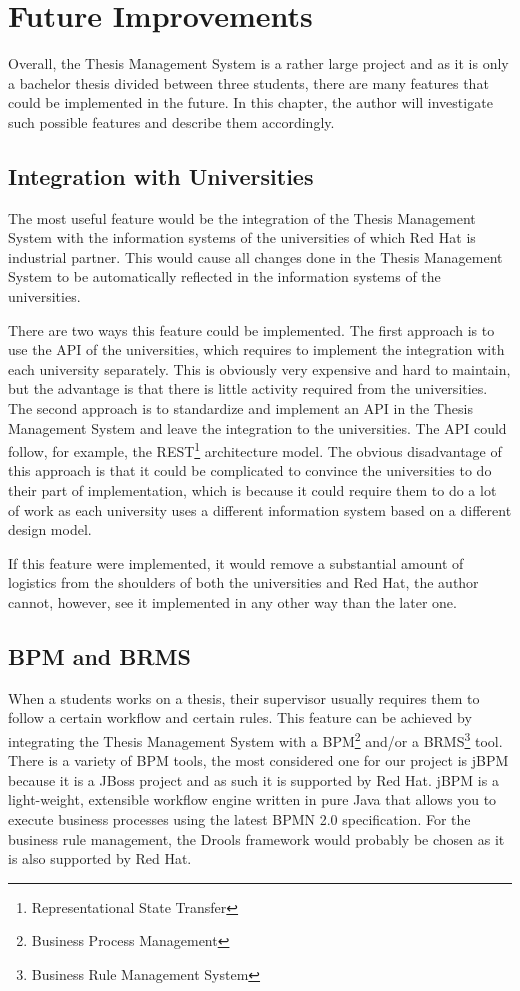\chapter{Future Improvements}

Overall, the Thesis Management System is a rather large project and as it is only a bachelor thesis divided between three students, there are many features that could be implemented in the future. In this chapter, the author will investigate such possible features and describe them accordingly.

\section{Integration with Universities}

The most useful feature would be the integration of the Thesis Management System with the information systems of the universities of which Red Hat is industrial partner. This would cause all changes done in the Thesis Management System to be automatically reflected in the information systems of the universities. 

There are two ways this feature could be implemented. The first approach is to use the API of the universities, which requires to implement the integration with each university separately. This is obviously very expensive and hard to maintain, but the advantage is that there is little activity required from the universities. The second approach is to standardize and implement an API in the Thesis Management System and leave the integration to the universities. The API could follow, for example, the REST\footnote{Representational State Transfer} architecture model. The obvious disadvantage of this approach is that it could be complicated to convince the universities to do their part of implementation, which is because it could require them to do a lot of work as each university uses a different information system based on a different design model. 

If this feature were implemented, it would remove a substantial amount of logistics from the shoulders of both the universities and Red Hat, the author cannot, however, see it implemented in any other way than the later one.

\section{BPM and BRMS}

When a students works on a thesis, their supervisor usually requires them to follow a certain workflow and certain rules. This feature can be achieved by integrating the Thesis Management System with a BPM\footnote{Business Process Management} and/or a BRMS\footnote{Business Rule Management System} tool. There is a variety of BPM tools, the most considered one for our project is jBPM because it is a JBoss project and as such it is supported by Red Hat. jBPM is a light-weight, extensible workflow engine written in pure Java that allows you to execute business processes using the latest BPMN 2.0 specification\cite{jbpm-homepage}. For the business rule management, the Drools framework would probably be chosen as it is also supported by Red Hat. 

